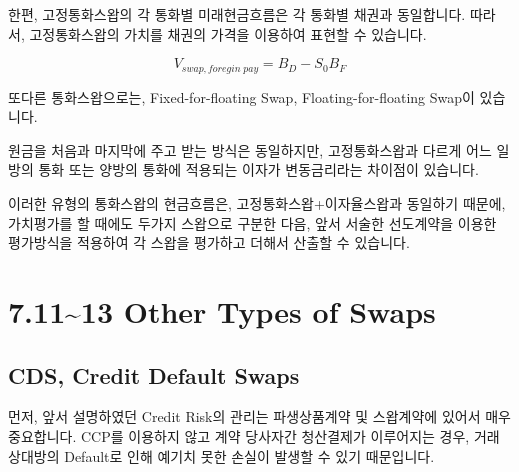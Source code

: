 \documentclass[
  letterpaper,
  DIV=11,
  numbers=noendperiod]{scrreprt}
\begin{document}
한편, 고정통화스왑의 각 통화별 미래현금흐름은 각 통화별 채권과
동일합니다. 따라서, 고정통화스왑의 가치를 채권의 가격을 이용하여 표현할
수 있습니다.

\[V_{swap,foregin\;pay}=B_D-S_0B_F\]

\begin{tcolorbox}[enhanced jigsaw, toprule=.15mm, breakable, left=2mm, leftrule=.75mm, opacitybacktitle=0.6, coltitle=black, rightrule=.15mm, colback=white, titlerule=0mm, bottomtitle=1mm, colframe=quarto-callout-note-color-frame, title=\textcolor{quarto-callout-note-color}{\faInfo}\hspace{0.5em}{Another Currency Swaps}, toptitle=1mm, arc=.35mm, colbacktitle=quarto-callout-note-color!10!white, opacityback=0, bottomrule=.15mm]

또다른 통화스왑으로는, Fixed-for-floating Swap, Floating-for-floating
Swap이 있습니다.

원금을 처음과 마지막에 주고 받는 방식은 동일하지만, 고정통화스왑과
다르게 어느 일방의 통화 또는 양방의 통화에 적용되는 이자가 변동금리라는
차이점이 있습니다.

이러한 유형의 통화스왑의 현금흐름은, 고정통화스왑+이자율스왑과 동일하기
때문에, 가치평가를 할 때에도 두가지 스왑으로 구분한 다음, 앞서 서술한
선도계약을 이용한 평가방식을 적용하여 각 스왑을 평가하고 더해서 산출할
수 있습니다.

\end{tcolorbox}

\section*{7.11\textasciitilde13 Other Types of
Swaps}\label{other-types-of-swaps}


\subsection*{CDS, Credit Default Swaps}\label{cds-credit-default-swaps}

먼저, 앞서 설명하였던 Credit Risk의 관리는 파생상품계약 및 스왑계약에
있어서 매우 중요합니다. CCP를 이용하지 않고 계약 당사자간 청산결제가
이루어지는 경우, 거래상대방의 Default로 인해 예기치 못한 손실이 발생할
수 있기 때문입니다.
\end{document}
